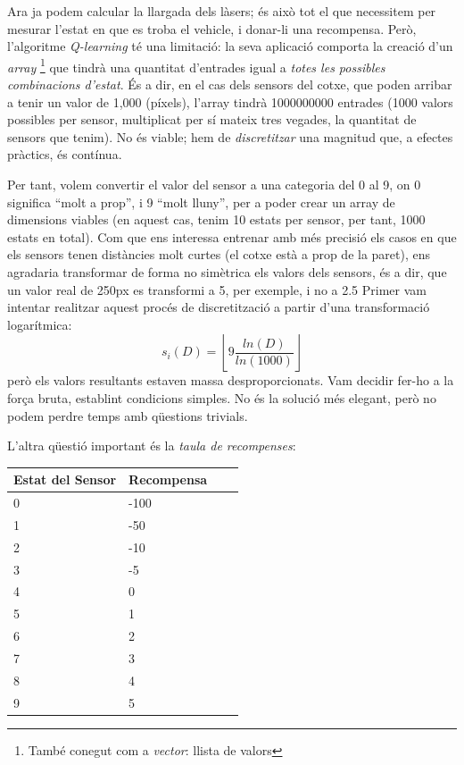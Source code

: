 Ara ja podem calcular la llargada dels làsers; és això tot el que necessitem per mesurar l'estat
en que es troba el vehicle, i donar-li una recompensa. Però, l'algoritme \emph{Q-learning} té una limitació: la seva aplicació
comporta la creació d'un \emph{array} \footnote{També conegut com a \emph{vector}: llista de valors}
que tindrà una quantitat d'entrades igual a \emph{totes les possibles combinacions d'estat}. És a dir,
en el cas dels sensors del cotxe, que poden arribar a tenir un valor de 1,000 (píxels), l'array
tindrà \num{1000000000} entrades (1000 valors possibles per sensor, multiplicat per sí mateix tres vegades, la quantitat
de sensors que tenim). No és viable; hem de \emph{discretitzar} una magnitud que, a efectes pràctics, és contínua.

Per tant, volem convertir el valor del sensor a una categoria del 0 al 9, on 0 significa ``molt a prop'', i 9 ``molt lluny'',
per a poder crear un array de dimensions viables (en aquest cas, tenim 10 estats per sensor, per tant, 1000 estats en total).
Com que ens interessa entrenar amb més precisió els casos en que els sensors tenen distàncies molt curtes (el cotxe està a 
prop de la paret), ens agradaria transformar de forma no simètrica els valors dels sensors, és a dir, que un valor real de
250px es transformi a 5, per exemple, i no a 2.5
Primer vam intentar realitzar aquest procés de discretització a partir d'una transformació logarítmica:
\[
s_i(D) = \left\lfloor 9 \frac{ln(D)}{ln(1000)} \right\rfloor
\]
però els valors resultants estaven massa desproporcionats. Vam decidir fer-ho a la força bruta, establint condicions
simples. No és la solució més elegant, però no podem perdre temps amb qüestions trivials.

L'altra qüestió important és la \emph{taula de recompenses}:

\begin{center}
    \begin{tabular}{| l | l | l | l |}
    \hline
    Estat del Sensor & Recompensa \\ \hline
    0 & -100 \\ \hline
    1 & -50 \\ \hline
    2 & -10 \\ \hline
    3 & -5 \\ \hline
    4 & 0 \\ \hline
    5 & 1 \\ \hline
    6 & 2 \\ \hline
    7 & 3 \\ \hline
    8 & 4 \\ \hline
    9 & 5 \\ \hline
    \end{tabular}
\end{center}















